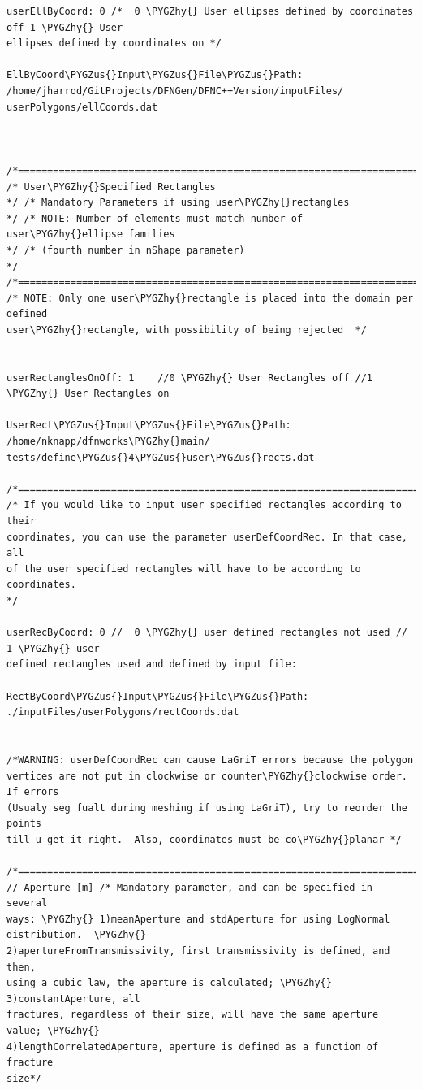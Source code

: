 \documentclass[letterpaper,10pt,english]{sphinxmanual}
\def\PYGZus{\char`\_}
\def\PYGZhy{\char`\-}
\begin{document}
\begin{Verbatim}[commandchars=\\\{\}]
userEllByCoord: 0 /*  0 \PYGZhy{} User ellipses defined by coordinates off 1 \PYGZhy{} User
ellipses defined by coordinates on */

EllByCoord\PYGZus{}Input\PYGZus{}File\PYGZus{}Path:
/home/jharrod/GitProjects/DFNGen/DFNC++Version/inputFiles/
userPolygons/ellCoords.dat



/*===========================================================================*/
/* User\PYGZhy{}Specified Rectangles
*/ /* Mandatory Parameters if using user\PYGZhy{}rectangles
*/ /* NOTE: Number of elements must match number of user\PYGZhy{}ellipse families
*/ /* (fourth number in nShape parameter)
*/
/*===========================================================================*/
/* NOTE: Only one user\PYGZhy{}rectangle is placed into the domain per defined
user\PYGZhy{}rectangle, with possibility of being rejected  */


userRectanglesOnOff: 1    //0 \PYGZhy{} User Rectangles off //1 \PYGZhy{} User Rectangles on

UserRect\PYGZus{}Input\PYGZus{}File\PYGZus{}Path: /home/nknapp/dfnworks\PYGZhy{}main/
tests/define\PYGZus{}4\PYGZus{}user\PYGZus{}rects.dat

/*===========================================================================*/
/* If you would like to input user specified rectangles according to their
coordinates, you can use the parameter userDefCoordRec. In that case, all
of the user specified rectangles will have to be according to coordinates.
*/

userRecByCoord: 0 //  0 \PYGZhy{} user defined rectangles not used //  1 \PYGZhy{} user
defined rectangles used and defined by input file:

RectByCoord\PYGZus{}Input\PYGZus{}File\PYGZus{}Path: ./inputFiles/userPolygons/rectCoords.dat


/*WARNING: userDefCoordRec can cause LaGriT errors because the polygon
vertices are not put in clockwise or counter\PYGZhy{}clockwise order.  If errors
(Usualy seg fualt during meshing if using LaGriT), try to reorder the points
till u get it right.  Also, coordinates must be co\PYGZhy{}planar */

/*===========================================================================*/
// Aperture [m] /* Mandatory parameter, and can be specified in several
ways: \PYGZhy{} 1)meanAperture and stdAperture for using LogNormal distribution.  \PYGZhy{}
2)apertureFromTransmissivity, first transmissivity is defined, and then,
using a cubic law, the aperture is calculated; \PYGZhy{} 3)constantAperture, all
fractures, regardless of their size, will have the same aperture value; \PYGZhy{}
4)lengthCorrelatedAperture, aperture is defined as a function of fracture
size*/


\end{Verbatim}
\end{document}
